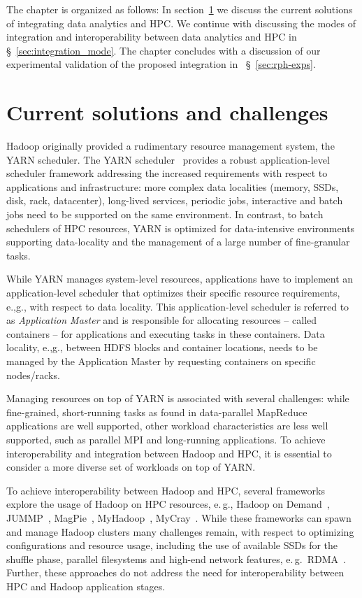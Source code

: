 The chapter is organized as follows: In section~\ref{sec:hpc_hadoop_rel} we discuss the current solutions of integrating data analytics and HPC.
We continue with discussing the modes of integration and interoperability between data analytics and HPC in \S~\ref{sec:integration_mode}.
The chapter concludes with a discussion of our experimental validation of the proposed integration in ~\S~\ref{sec:rph-exps}.

\section{Current solutions and challenges}
\label{sec:hpc_hadoop_rel}
Hadoop originally provided a rudimentary resource management system, the YARN scheduler.
The YARN scheduler~\cite{vavilapalli2013apache} provides a robust application-level scheduler framework addressing the increased requirements with respect to applications and infrastructure: more complex data localities (memory, SSDs, disk, rack, datacenter), long-lived services, periodic jobs, interactive and batch jobs need to be supported on the same environment.
In contrast, to batch schedulers of HPC resources, YARN is optimized for data-intensive environments supporting data-locality and the management of a large number of fine-granular tasks.

While YARN manages system-level resources, applications have to implement an application-level scheduler that optimizes their specific resource requirements, e.,g., with respect to data locality.
This application-level scheduler is referred to as \textit{Application Master} and is responsible for allocating resources -- called containers -- for applications and executing tasks in these containers.
Data locality, e.,g., between HDFS blocks and container locations, needs to be managed by the Application Master by requesting containers on specific nodes/racks.

Managing resources on top of YARN is associated with several challenges: while fine-grained, short-running tasks as found in data-parallel MapReduce applications are well supported, other workload characteristics are less well supported, such as parallel MPI and long-running applications.
To achieve interoperability and integration between Hadoop and HPC, it is essential to consider a more diverse set of workloads on top of YARN.

To achieve interoperability between Hadoop and HPC, several frameworks explore the usage of Hadoop on HPC resources, e.\,g., Hadoop on Demand~\cite{hod}, JUMMP~\cite{moody2013jummp}, MagPie~\cite{chu2015magpie}, MyHadoop~\cite{krishnan2011myhadoop}, MyCray~\cite{mycray}.
While these frameworks can spawn and manage Hadoop clusters many challenges remain, with respect to optimizing configurations and resource usage, including the use of available SSDs for the shuffle phase, parallel filesystems and high-end network features, e.\,g.\ RDMA~\cite{rahman2014homr}.
Further, these approaches do not address the need for interoperability between HPC and Hadoop application stages.

